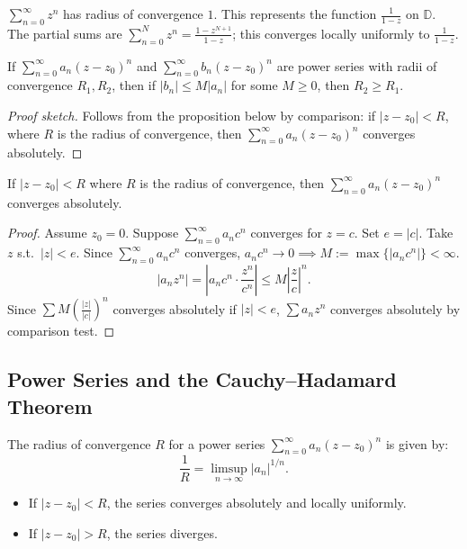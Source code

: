 \documentclass[11pt]{article}
\begin{document}
\begin{example}
$\sum_{n=0}^\infty z^n$ has radius of convergence $1$. This represents the function $\frac{1}{1-z}$ on $\mathbb{D}$. The partial sums are $\sum_{n=0}^N z^n = \frac{1-z^{N+1}}{1-z}$; this converges locally uniformly to $\frac{1}{1-z}$.
\end{example}

\begin{proposition}
If $\sum_{n=0}^\infty a_n(z-z_0)^n$ and $\sum_{n=0}^\infty b_n(z-z_0)^n$ are power series with radii of convergence $R_1, R_2$, then if $|b_n| \le M|a_n|$ for some $M \ge 0$, then $R_2 \ge R_1$.
\end{proposition}

\begin{proof}[Proof sketch]
Follows from the proposition below by comparison: if $|z-z_0| < R$, where $R$ is the radius of convergence, then $\sum_{n=0}^\infty a_n(z-z_0)^n$ converges absolutely.
\end{proof}

\begin{proposition}
If $|z-z_0| < R$ where $R$ is the radius of convergence, then $\sum_{n=0}^\infty a_n(z-z_0)^n$ converges absolutely.
\end{proposition}
\begin{proof}
Assume $z_0 = 0$. Suppose $\sum_{n=0}^\infty a_n c^n$ converges for $z=c$. Set $e = |c|$. Take $z$ s.t.\ $|z| < e$. Since $\sum_{n=0}^\infty a_nc^n$ converges, $a_nc^n \to 0 \implies M := \max\{|a_nc^n|\} < \infty$.
\[
|a_nz^n| = \left|a_nc^n\cdot \frac{z^n}{c^n}\right| \le M\left|\frac{z}{c}\right|^n.
\]
Since $\sum M\left(\frac{|z|}{|c|}\right)^n$ converges absolutely if $|z| < e$, $\sum a_nz^n$ converges absolutely by comparison test.
\end{proof}

\subsection{Power Series and the Cauchy--Hadamard Theorem}

\begin{theorem}
The radius of convergence $R$ for a power series $\sum_{n=0}^\infty a_n (z-z_0)^n$ is given by:
\[
\frac{1}{R} = \limsup_{n \to \infty} |a_n|^{1/n}.
\]
\begin{itemize}
    \item If $|z - z_0| < R$, the series converges absolutely and locally uniformly.
    \item If $|z - z_0| > R$, the series diverges.
\end{itemize}
\end{theorem}
\end{document}
